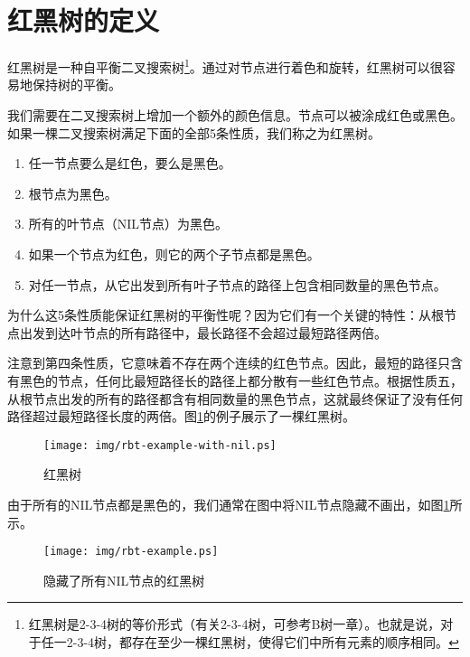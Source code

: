 \documentclass[UTF8]{article}
\begin{document}
\section{红黑树的定义}

红黑树是一种自平衡二叉搜索树\cite{wiki-rbt}\footnote{红黑树是2-3-4树的等价形式（有关2-3-4树，可参考B树一章）。也就是说，对于任一2-3-4树，都存在至少一棵红黑树，使得它们中所有元素的顺序相同。}。通过对节点进行着色和旋转，红黑树可以很容易地保持树的平衡。

我们需要在二叉搜索树上增加一个额外的颜色信息。节点可以被涂成红色或黑色。如果一棵二叉搜索树满足下面的全部5条性质，我们称之为红黑树\cite{CLRS}。

\begin{enumerate}
\item 任一节点要么是红色，要么是黑色。
\item 根节点为黑色。
\item 所有的叶节点（NIL节点）为黑色。
\item 如果一个节点为红色，则它的两个子节点都是黑色。
\item 对任一节点，从它出发到所有叶子节点的路径上包含相同数量的黑色节点。
\end{enumerate}

为什么这5条性质能保证红黑树的平衡性呢？因为它们有一个关键的特性：从根节点出发到达叶节点的所有路径中，最长路径不会超过最短路径两倍。

注意到第四条性质，它意味着不存在两个连续的红色节点。因此，最短的路径只含有黑色的节点，任何比最短路径长的路径上都分散有一些红色节点。根据性质五，从根节点出发的所有的路径都含有相同数量的黑色节点，这就最终保证了没有任何路径超过最短路径长度的两倍\cite{wiki-rbt}。图\ref{fig:rbt-example-with-nil}的例子展示了一棵红黑树。

\begin{figure}[htbp]
       \begin{center}
	\texttt{[image: img/rbt-example-with-nil.ps]}
        \caption{红黑树} \label{fig:rbt-example-with-nil}
       \end{center}
\end{figure}

由于所有的NIL节点都是黑色的，我们通常在图中将NIL节点隐藏不画出，如图\ref{fig:rbt-example-with-nil}所示。

\begin{figure}[htbp]
  \centering
  \texttt{[image: img/rbt-example.ps]}
  \caption{隐藏了所有NIL节点的红黑树} \label{fig:rbt-example}
\end{figure}
\end{document}
